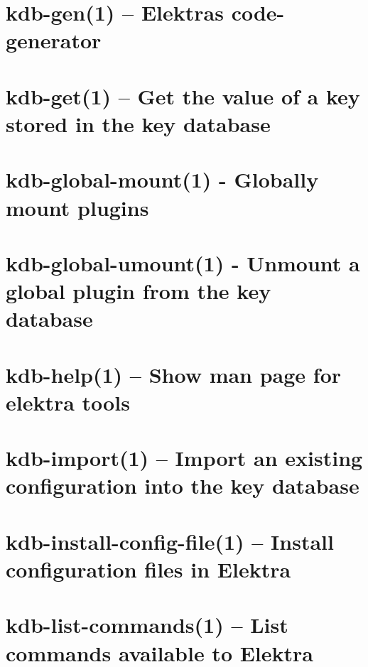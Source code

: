 \let\mypdfximage\pdfximage\def\pdfximage{\immediate\mypdfximage}\documentclass[twoside]{book}
\newcommand{\+}{\discretionary{\mbox{\scriptsize$\hookleftarrow$}}{}{}}
\begin{document}
\chapter{kdb-\/gen(1) -- Elektra\textquotesingle{}s code-\/generator}
\label{doc_help_kdb-gen_md}

\chapter{kdb-\/get(1) -- Get the value of a key stored in the key database}
\label{doc_help_kdb-get_md}

\chapter{kdb-\/global-\/mount(1) -\/ Globally mount plugins}
\label{doc_help_kdb-global-mount_md}

\chapter{kdb-\/global-\/umount(1) -\/ Unmount a global plugin from the key database}
\label{doc_help_kdb-global-umount_md}

\chapter{kdb-\/help(1) -- Show man page for elektra tools}
\label{doc_help_kdb-help_md}

\chapter{kdb-\/import(1) -- Import an existing configuration into the key database}
\label{doc_help_kdb-import_md}

\chapter{kdb-\/install-\/config-\/file(1) -- Install configuration files in Elektra}
\label{doc_help_kdb-install-config-file_md}

\chapter{kdb-\/list-\/commands(1) -- List commands available to Elektra}
\label{doc_help_kdb-list-commands_md}

\end{document}
